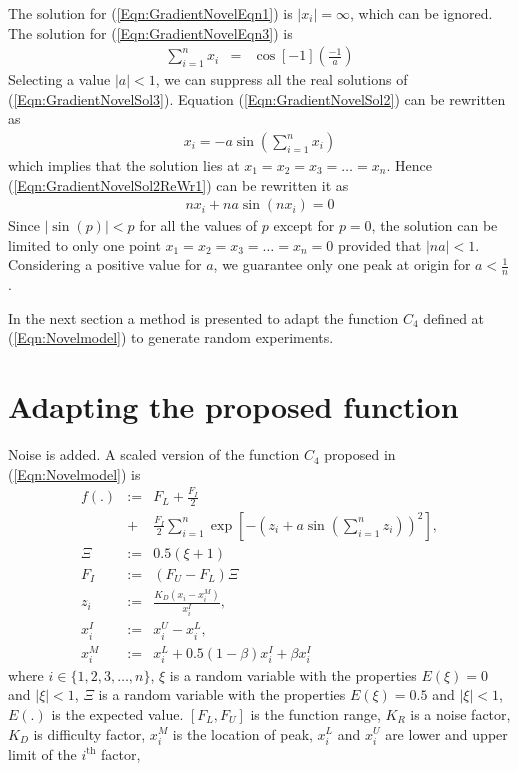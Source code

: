 \documentclass[twocolumn]{svjour3}          %
\begin{document}
The solution for (\ref{Eqn:GradientNovelEqn1}) is $|x_i|=\infty$, which can be ignored. The solution for (\ref{Eqn:GradientNovelEqn3}) is
\begin{eqnarray}
	\sum_{i=1}^{n} x_i &=& \cos[-1](\frac{-1}{a}) \label{Eqn:GradientNovelSol3}
\end{eqnarray}
Selecting a value $|a|<1$, we can suppress all the real solutions of (\ref{Eqn:GradientNovelSol3}). Equation (\ref{Eqn:GradientNovelSol2}) can be rewritten as 
\begin{eqnarray}
	x_i = -a\sin\left(\sum_{i=1}^{n} x_i\right) \label{Eqn:GradientNovelSol2ReWr1}
\end{eqnarray}
which implies that the solution lies at $x_1 = x_2 = x_3 = \dots = x_n$. Hence (\ref{Eqn:GradientNovelSol2ReWr1}) can be rewritten it as
\begin{eqnarray}
	nx_i + na\sin(nx_i) = 0 \label{Eqn:GradientNovelSol2ReWr2}
\end{eqnarray}
Since $|\sin(p)|<p$ for all the values of $p$ except for $p = 0$, the solution can be limited to only one point $x_1 = x_2 = x_3 = \dots = x_n=0$ provided that $|na|<1$. Considering a positive value for $a$, we guarantee only one peak at origin for $a<\frac{1}{n}$.
\par
In the next section a method is presented to adapt the function $C_4$ defined at (\ref{Eqn:Novelmodel}) to generate random experiments.
\section{Adapting the proposed function}
\label{Sec:Adapting}
Noise is added.
A scaled version of the function $C_4$ proposed in (\ref{Eqn:Novelmodel}) is
\begin{eqnarray}
	f(.) &:=& F_L + \frac{F_I}{2} \nonumber \\
	&+&\frac{F_I}{2}\sum_{i=1}^{n}{\exp[-\left(z_i + a\sin\left(\sum_{i=1}^{n} z_i\right)\right)^2]}, \label{Eqn:AdaptedFunction} \\
	\Xi &:=& 0.5 (\xi + 1) \label{Eqn:ChangeOfRandomVar} \\
	F_I &:=& (F_U-F_L)\Xi \label{Eqn:FunctionInterval} \\
	z_i &:=& \frac{K_D(x_i-x_i^M)}{x_i^I}, \label{Eqn:ZiDefinition} \\
	x_i^I &:=& x_i^U - x_i^L, \label{Eqn:InterDefinition} \\
	x_i^M &:=& x_i^L + 0.5(1-\beta)x_i^I+\beta x_i^I\label{Eqn:FactorAtMaximumValue}
\end{eqnarray}
where  $i \in \{1, 2, 3, \dots, n\}$, $\xi$ is a random variable with the properties $E(\xi)=0$ and $|\xi|<1$, $\Xi$ is a random variable with the properties $E(\xi)=0.5$ and $|\xi|<1$,  $E(.)$ is the expected value. $[F_L, F_U]$ is the function range, $K_R$ is a noise factor, $K_D$ is difficulty factor, $x_i^M$ is the location of peak, $x_i^L$ and $x_i^U$ are lower and upper limit of the $i^{\text{th}}$ factor, 
\end{document}
